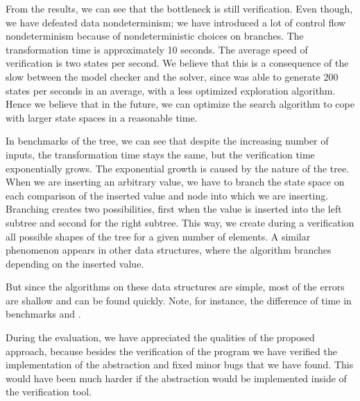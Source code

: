 From the results, we can see that the bottleneck is still verification. Even though,
we have defeated data nondeterminism; we have introduced a lot of control flow
nondeterminism because of nondeterministic choices on branches. The transformation
time is approximately 10 seconds. The average speed of verification is two states
per second. We believe that this is a consequence of the slow \API between the model
checker and the \SMT solver, since \SymDIVINE was able to generate 200 states
per seconds in an average, with a less optimized exploration algorithm. Hence we
believe that in the future, we can optimize the search algorithm to cope with
larger state spaces in a reasonable time.

In benchmarks of the \AVL tree, we can see that despite the increasing number of
inputs, the transformation time stays the same, but the verification time
exponentially grows. The exponential growth is caused by the nature of the \AVL
tree. When we are inserting an arbitrary value, we have to branch the state space
on each comparison of the inserted value and node into which we are inserting.
Branching creates two possibilities, first when the value is inserted into the
left subtree and second for the right subtree. This way, we create during a
verification all possible shapes of the \AVL tree for a given number of elements.
A similar phenomenon appears in other data structures, where the algorithm
branches depending on the inserted value.

But since the algorithms on these data structures are simple, most of the errors
are shallow and can be found quickly. Note, for instance, the difference of time
in benchmarks  and .

During the evaluation, we have appreciated the qualities of the proposed
approach, because besides the verification of the program we have verified the
implementation of the abstraction and fixed minor bugs that we have found. This
would have been much harder if the abstraction would be implemented inside of the
verification tool.
